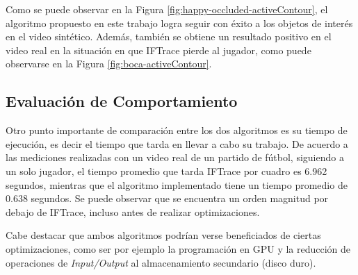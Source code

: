 Como se puede observar en la Figura \ref{fig:happy-occluded-activeContour}, el
algoritmo propuesto en este trabajo logra seguir con éxito a los objetos de
interés en el video sintético. Además, también se obtiene un resultado positivo
en el video real en la situación en que IFTrace pierde al jugador, como puede
observarse en la Figura \ref{fig:boca-activeContour}.

\subsection{Evaluación de Comportamiento}

Otro punto importante de comparación entre los dos algoritmos es su tiempo de
ejecución, es decir el tiempo que tarda en llevar a cabo su trabajo.  De
acuerdo a las mediciones realizadas con un video real de un partido de fútbol,
siguiendo a un solo jugador, el tiempo promedio que tarda IFTrace por cuadro es
6.962 segundos, mientras que el algoritmo implementado tiene un tiempo promedio
de 0.638 segundos. Se puede observar que se encuentra un orden magnitud por
debajo de IFTrace, incluso antes de realizar optimizaciones.

Cabe destacar que ambos algoritmos podrían verse beneficiados de ciertas
optimizaciones, como ser por ejemplo la programación en GPU y la reducción de
operaciones de \textit{Input/Output} al almacenamiento secundario (disco duro).
